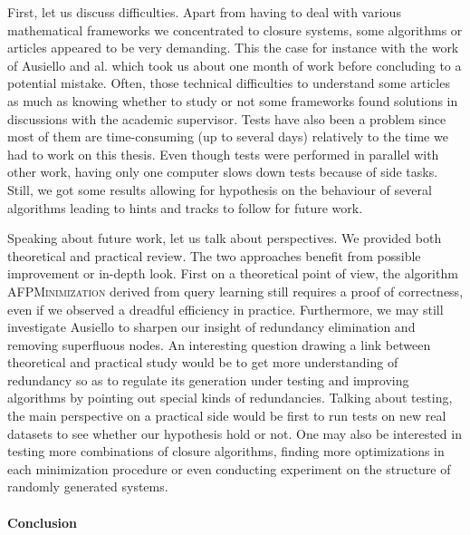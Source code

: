 First, let us discuss difficulties. Apart from having to deal with various mathematical frameworks we concentrated to closure systems, some algorithms
or articles appeared to be very demanding. This the case for instance with the work of Ausiello and al. which took us about one month of work before concluding to a potential mistake. Often, those technical difficulties to understand some articles as much as knowing whether to study or not some frameworks found solutions in discussions with the academic supervisor. Tests have also been a problem since most of them are time-consuming (up to several days) relatively to the time we had to work on this thesis. Even though tests were performed in parallel with other work, having only one computer slows down tests because of side tasks. Still, we got some results allowing for hypothesis
on the behaviour of several algorithms leading to hints and tracks to follow for future work.

\vspace{1.2em}

Speaking about future work, let us talk about perspectives. We provided both theoretical and practical review. The two approaches benefit from possible improvement or in-depth look. First on a theoretical point of view, the algorithm \textsc{AFPMinimization} derived from query learning still requires
a proof of correctness, even if we observed a dreadful efficiency in practice. Furthermore, we may still investigate Ausiello to sharpen our insight of redundancy elimination and removing superfluous nodes. An interesting question
drawing a link between theoretical and practical study would be to get more
understanding of redundancy so as to regulate its generation under testing and
improving algorithms by pointing out special kinds of redundancies. Talking about testing, the main perspective on a practical side would be first to run tests on new real datasets to see whether our hypothesis hold or not. One may also be interested in testing more combinations of closure algorithms, finding
more optimizations in each minimization procedure or even conducting experiment on the structure of randomly generated systems.


\paragraph{Conclusion}

